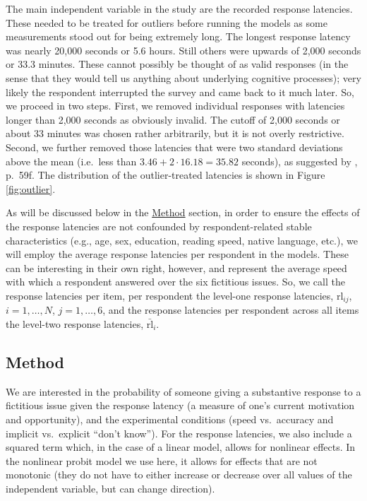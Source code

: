 \documentclass[Royal,times,sageh]{sagej}
\begin{document}
The main independent variable in the study are the recorded response
latencies. These needed to be treated for outliers before running the
models as some measurements stood out for being extremely long. The
longest response latency was nearly 20,000 seconds or 5.6 hours. Still
others were upwards of 2,000 seconds or 33.3 minutes. These cannot
possibly be thought of as valid responses (in the sense that they would
tell us anything about underlying cognitive processes); very likely the
respondent interrupted the survey and came back to it much later. So, we
proceed in two steps. First, we removed individual responses with
latencies longer than 2,000 seconds as obviously invalid. The cutoff of
2,000 seconds or about 33 minutes was chosen rather arbitrarily, but it
is not overly restrictive. Second, we further removed those latencies
that were two standard deviations above the mean (i.e.~less than
\(3.46 + 2 \cdot 16.18 = 35.82\) seconds), as suggested by
\citet{Mayerl2008}, p.~59f. The distribution of the outlier-treated
latencies is shown in Figure \ref{fig:outlier}.

As will be discussed below in the \protect\hyperlink{method}{Method}
section, in order to ensure the effects of the response latencies are
not confounded by respondent-related stable characteristics (e.g., age,
sex, education, reading speed, native language, etc.), we will employ
the average response latencies per respondent in the models. These can
be interesting in their own right, however, and represent the average
speed with which a respondent answered over the six fictitious issues.
So, we call the response latencies per item, per respondent the
level-one response latencies, \(\text{rl}_{ij}\), \(i = 1, \ldots, N\),
\(j = 1, \ldots, 6\), and the response latencies per respondent across
all items the level-two response latencies, \(\bar{\text{rl}}_{i}\).

\hypertarget{method}{%
\subsection{Method}\label{method}}

We are interested in the probability of someone giving a substantive
response to a fictitious issue given the response latency (a measure of
one's current motivation and opportunity), and the experimental
conditions (speed vs.~accuracy and implicit vs.~explicit ``don't
know''). For the response latencies, we also include a squared term
which, in the case of a linear model, allows for nonlinear effects. In
the nonlinear probit model we use here, it allows for effects that are
not monotonic (they do not have to either increase or decrease over all
values of the independent variable, but can change direction).
\end{document}

